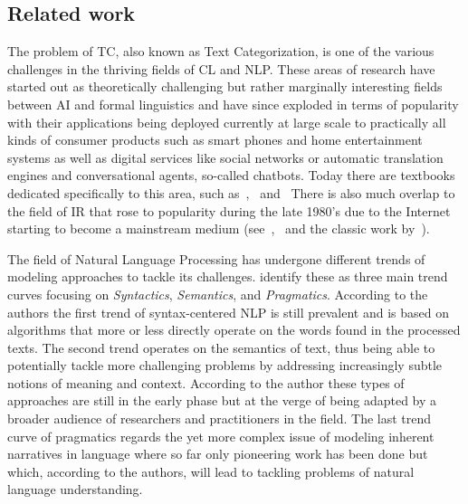 \subsection{Related work}

The problem of \gls{TC}, also known as Text Categorization, is one of the various challenges in the thriving fields of \gls{CL} and \gls{NLP}. These areas of research have started out as theoretically challenging but rather marginally interesting fields between \gls{AI} and formal linguistics and have since exploded in terms of popularity with their applications being deployed currently at large scale to practically all kinds of consumer products such as smart phones and home entertainment systems as well as digital services like social networks or automatic translation engines and conversational agents, so-called chatbots.
Today there are textbooks dedicated specifically to this area, such as~\cite{Manning:1999aa},~\cite{Jurafsky:2014aa} and~\cite{Clark:2013aa} There is also much overlap to the field of \gls{IR} that rose to popularity during the late 1980's due to the Internet starting to become a mainstream medium (see~\cite{Manning:2008aa},~\cite{Leskovec:2014aa} and the classic work by~\cite{Rijsbergen:1979aa}).

The field of Natural Language Processing has undergone different trends of modeling approaches to tackle its challenges. \cite{Cambria:2014aa} identify these as three main trend curves focusing on \emph{Syntactics}, \emph{Semantics}, and \emph{Pragmatics}. According to the authors the first trend of syntax-centered NLP is still prevalent and is based on algorithms that more or less directly operate on the words found in the processed texts.
The second trend operates on the semantics of text, thus being able to potentially tackle more challenging problems by addressing increasingly subtle notions of meaning and context. According to the author these types of approaches are still in the early phase but at the verge of being adapted by a broader audience of researchers and practitioners in the field.
The last trend curve of pragmatics regards the yet more complex issue of modeling inherent narratives in language where so far only pioneering work has been done but which, according to the authors, will lead to tackling problems of natural language understanding.

